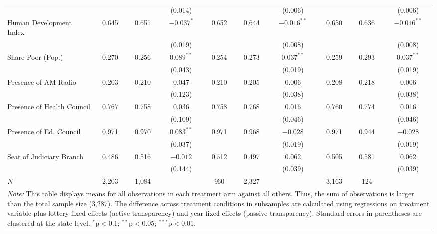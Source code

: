 \begin{table}[!htbp]
\begin{tabular}{@{\extracolsep{-4pt}}l@{\extracolsep{-3pt}}ccccccccc}
                                     &       &       & (0.014)        &       &       & (0.006)        &        &       & (0.006)           \\
Human Development Index \hspace{1pt} & 0.645 & 0.651 & $-0.037^{*}$   & 0.652 & 0.644 & $-0.016^{**}$  &  0.650 & 0.636 & $-0.016^{**}$     \\
                                     &       &       & (0.019)        &       &       & (0.008)        &        &       & (0.008)           \\
Share Poor (Pop.)                    & 0.270 & 0.256 & $0.089^{**}$   & 0.254 & 0.273 & $0.037^{**}$   &  0.259 & 0.293 & $0.037^{**}$      \\
                                     &       &       & (0.043)        &       &       & (0.019)        &        &       & (0.019)           \\
Presence of AM Radio                 & 0.203 & 0.210 & 0.047          & 0.210 & 0.205 & 0.006          &  0.208 & 0.218 & 0.006             \\
                                     &       &       & (0.123)        &       &       & (0.038)        &        &       & (0.038)           \\
Presence of Health Council           & 0.767 & 0.758 & 0.036          & 0.758 & 0.768 & 0.016          &  0.760 & 0.774 & 0.016             \\
                                     &       &       & (0.109)        &       &       & (0.046)        &        &       & (0.046)           \\
Presence of Ed. Council              & 0.971 & 0.970 & $0.083^{**}$   & 0.971 & 0.968 & $-0.028$       &  0.971 & 0.944 & $-0.028$          \\
                                     &       &       & (0.037)        &       &       & (0.019)        &        &       & (0.019)           \\
Seat of Judiciary Branch             & 0.486 & 0.516 & $-0.012$       & 0.512 & 0.497 & 0.062          &  0.505 & 0.581 & 0.062             \\
                                     &       &       & (0.144)        &       &       & (0.039)        &        &       & (0.039)         \B\\
\hline
\emph{N}                             & 2,203 & 1,084 &        & 960   & 2,327 &        & 3,163  & 124   &  \T  \B \\
\hline
\hline
\multicolumn{10}{p{\textwidth}}{\emph{Note:} This table displays means for all observations in each treatment arm against all others. Thus, the sum of observations is larger than the total sample size (3,287). The difference across treatment conditions in subsamples are calculated using regressions on treatment variable plus lottery fixed-effects (active transparency) and year fixed-effects (passive transparency). Standard errors in parentheses are clustered at the state-level. $^{*}$p$<$0.1; $^{**}$p$<$0.05; $^{***}$p$<$0.01.}
\end{tabular}
\end{table}



